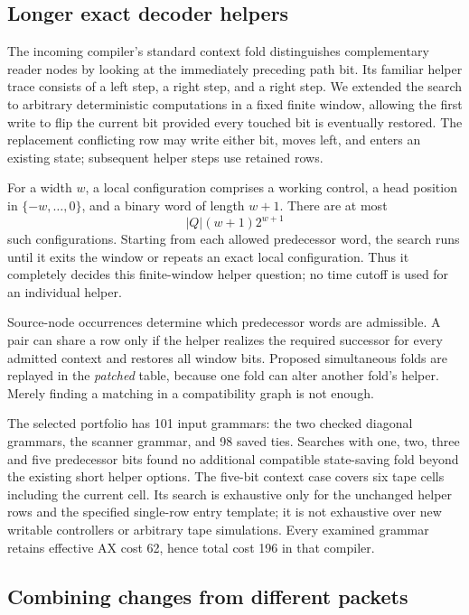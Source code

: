 \documentclass[10pt,letterpaper]{article}
\begin{document}
\subsection{Longer exact decoder helpers}

The incoming compiler's standard context fold distinguishes complementary
reader nodes by looking at the immediately preceding path bit. Its familiar
helper trace consists of a left step, a right step, and a right step. We
extended the search to arbitrary deterministic computations in a fixed finite
window, allowing the first write to flip the current bit provided every
touched bit is eventually restored. The replacement conflicting row may write
either bit, moves left, and enters an existing state; subsequent helper steps
use retained rows.

For a width $w$, a local configuration comprises a working control, a head
position in $\{-w,\ldots,0\}$, and a binary word of length $w+1$. There are
at most
\begin{equation}\label{eq:finite}
 |Q|(w+1)2^{w+1}
\end{equation}
such configurations. Starting from each allowed predecessor word, the search
runs until it exits the window or repeats an exact local configuration.
Thus it completely decides this finite-window helper question; no time cutoff
is used for an individual helper.

Source-node occurrences determine which predecessor words are admissible.
A pair can share a row only if the helper realizes the required successor
for every admitted context and restores all window bits. Proposed simultaneous
folds are replayed in the \emph{patched} table, because one fold can alter
another fold's helper. Merely finding a matching in a compatibility graph is
not enough.

The selected portfolio has 101 input grammars: the two checked diagonal
grammars, the scanner grammar, and 98 saved ties. Searches with one, two,
three and five predecessor bits found no additional compatible state-saving
fold beyond the existing short helper options. The five-bit context case
covers six tape cells including the current cell. Its search is exhaustive
only for the unchanged helper rows and the specified single-row entry template;
it is not exhaustive over new writable controllers or arbitrary tape
simulations. Every examined grammar retains effective AX cost 62, hence total
cost 196 in that compiler.

\subsection{Combining changes from different packets}
\end{document}
